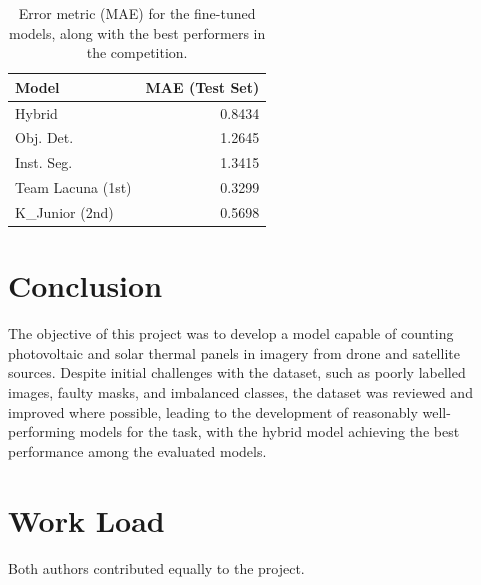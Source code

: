 \documentclass[conference]{IEEEtran}
\begin{document}
\begin{table}[H]
\centering
\caption{Error metric (MAE) for the fine-tuned models, along with the best performers in the competition.}
\label{tab:model02_results_transposed}
\begin{tabular}{lr}
\toprule
\textbf{Model} & \textbf{MAE (Test Set)} \\
\midrule
Hybrid & 0.8434 \\
Obj. Det. & 1.2645 \\
Inst. Seg. & 1.3415 \\
Team Lacuna (1st) & 0.3299 \\
K\_Junior (2nd) & 0.5698 \\
\bottomrule
\end{tabular}
\end{table}




\section{Conclusion}

The objective of this project was to develop a model capable of counting photovoltaic and solar thermal panels in imagery from drone and satellite sources. Despite initial challenges with the dataset, such as poorly labelled images, faulty masks, and imbalanced classes, the dataset was reviewed and improved where possible, leading to the development of reasonably well-performing models for the task, with the hybrid model achieving the best performance among the evaluated models.


\section*{Work Load}

Both authors contributed equally to the project.



\end{document}
